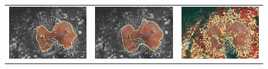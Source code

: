 \documentclass[smallextended]{svjour3}       %
\begin{document}
{{\begin{figure}[hp!]
\begin{tabular}{ccc}
		\includegraphics[scale=0.2]{images/segmentation/bc/coral/gc-seg.png} &
		\includegraphics[scale=0.2]{images/segmentation/bc/coral/corrected-seg.png} &					\includegraphics[scale=0.2]{images/segmentation/schoenemann/coral/coral-seg.png}\\				
						

\end{tabular}
\end{figure}}}
\end{document}
